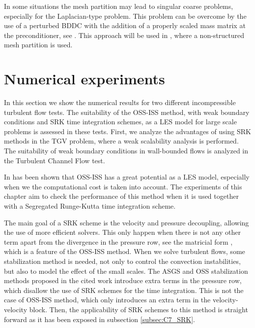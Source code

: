 In some situations the mesh partition may lead to singular coarse problems, especially for the Laplacian-type problem. This problem can be overcome by the use of a perturbed BDDC with the addition of a properly scaled mass matrix at the preconditioner, see \cite{santiago_badia_hieu_nguyen_balancing_2015}. This approach will be used in , where a non-structured mesh partition is used.


\section{Numerical experiments}
\label{sec-C7_experiments}
In this section we show the numerical results for two different incompressible turbulent flow tests. The suitability of the OSS-ISS method, with weak boundary conditions and SRK time integration schemes, as a LES model for large scale problems is assessed in these tests. First, we analyze the advantages of using SRK methods in the TGV problem, where a weak scalability analysis is performed. The suitability of weak boundary conditions in wall-bounded flows is analyzed in the Turbulent Channel Flow test. %

In \cite{colomes_mixed_2015} has been shown that OSS-ISS has a great potential as a LES model, especially when we the computational cost is taken into account. The experiments of this chapter aim to check the performance of this method when it is used together with a Segregated Runge-Kutta time integration scheme.

The main goal of a SRK scheme is the velocity and pressure decoupling, allowing the use of more efficient solvers. This only happen when there is not any other term apart from the divergence in the pressure row, see the matricial form , which is a feature of the OSS-ISS method. When we solve turbulent flows, some stabilization method is needed, not only to control the convection instabilities, but also to model the effect of the small scales. The ASGS and OSS stabilization methods proposed in the cited work introduce extra terms in the pressure row, which disallow the use of SRK schemes for the time integration. This is not the case of OSS-ISS method, which only introduces an extra term in the velocity-velocity block. Then, the applicability of SRK schemes to this method is straight forward as it has been exposed in subsection \ref{subsec:C7_SRK}.

